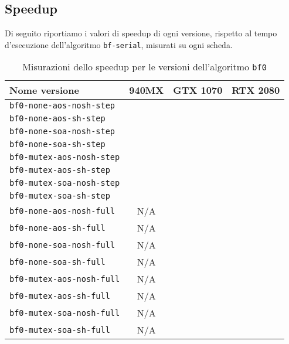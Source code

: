 \documentclass[a4paper]{article}
\begin{document}
	\subsection{Speedup}
	Di seguito riportiamo i valori di speedup di ogni versione, rispetto al tempo d'esecuzione dell'algoritmo \texttt{bf-serial}, misurati su ogni scheda.
	\begin{table}[!ht]
		\centering
		\begin{tabular}{|l|c|c|c|}
			\hline
			\textbf{Nome versione} & \textbf{940MX} & \textbf{GTX 1070} & \textbf{RTX 2080} \\ \hline
			\texttt{bf0-none-aos-nosh-step}  &  &  &  \\ \hline
			\texttt{bf0-none-aos-sh-step}    &  &  &  \\ \hline
			\texttt{bf0-none-soa-nosh-step}  &  &  &  \\ \hline
			\texttt{bf0-none-soa-sh-step}    &  &  &  \\ \hline
			\texttt{bf0-mutex-aos-nosh-step} &  &  &  \\ \hline
			\texttt{bf0-mutex-aos-sh-step}   &  &  &  \\ \hline
			\texttt{bf0-mutex-soa-nosh-step} &  &  &  \\ \hline
			\texttt{bf0-mutex-soa-sh-step}   &  &  &  \\ \hline
			\texttt{bf0-none-aos-nosh-full}  & N/A &  &  \\ \hline
			\texttt{bf0-none-aos-sh-full}    & N/A &  &  \\ \hline
			\texttt{bf0-none-soa-nosh-full}  & N/A &  &  \\ \hline
			\texttt{bf0-none-soa-sh-full}    & N/A &  &  \\ \hline
			\texttt{bf0-mutex-aos-nosh-full} & N/A &  &  \\ \hline
			\texttt{bf0-mutex-aos-sh-full}   & N/A &  &  \\ \hline
			\texttt{bf0-mutex-soa-nosh-full} & N/A &  &  \\ \hline
			\texttt{bf0-mutex-soa-sh-full}   & N/A &  &  \\ \hline
		\end{tabular}
		\label{tab:speedup_bf0}
		\caption{Misurazioni dello speedup per le versioni dell'algoritmo \texttt{bf0}}
	\end{table}
	
\end{document}
